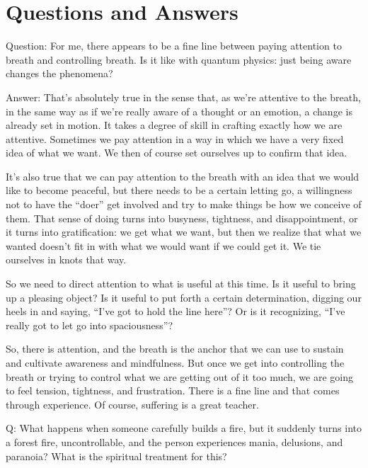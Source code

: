 \chapter{Questions and Answers}

\vspace{\the\qaskip}
Question: For me, there appears to be a fine line between paying
attention to breath and controlling breath. Is it like with quantum
physics: just being aware changes the phenomena?

\vspace{\the\qaskip}
Answer: That’s absolutely true in the sense that, as we’re attentive to
the breath, in the same way as if we’re really aware of a thought or an
emotion, a change is already set in motion. It takes a degree of skill
in crafting exactly how we are attentive. Sometimes we pay attention in
a way in which we have a very fixed idea of what we want. We then of
course set ourselves up to confirm that idea.

It’s also true that we can pay attention to the breath with an idea that
we would like to become peaceful, but there needs to be a certain
letting go, a willingness not to have the “doer” get involved and try to
make things be how we conceive of them. That sense of doing turns into
busyness, tightness, and disappointment, or it turns into gratification:
we get what we want, but then we realize that what we wanted doesn’t fit
in with what we would want if we could get it. We tie ourselves in knots
that way.

So we need to direct attention to what is useful at this time. Is it
useful to bring up a pleasing object? Is it useful to put forth a
certain determination, digging our heels in and saying, “I’ve got to
hold the line here”? Or is it recognizing, “I’ve really got to let go
into spaciousness”?

So, there is attention, and the breath is the anchor that we can use to
sustain and cultivate awareness and mindfulness. But once we get into
controlling the breath or trying to control what we are getting out of
it too much, we are going to feel tension, tightness, and frustration.
There is a fine line and that comes through experience. Of course,
suffering is a great teacher.

\vspace{\the\qaskip}
Q: What happens when someone carefully builds a fire, but it suddenly
turns into a forest fire, uncontrollable, and the person experiences
mania, delusions, and paranoia? What is the spiritual treatment for
this?

